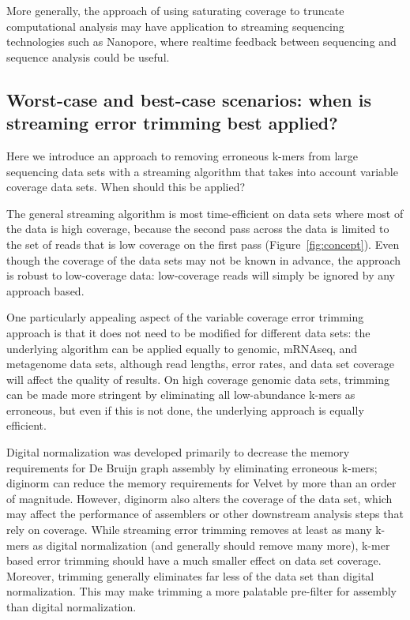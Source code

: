 \documentclass{article}
\begin{document}
More generally, the approach of using saturating coverage to truncate
computational analysis may have application to streaming sequencing
technologies such as Nanopore, where realtime feedback between
sequencing and sequence analysis could be useful.

\subsection{Worst-case and best-case scenarios: when is streaming error
trimming best applied?}

Here we introduce an approach to removing erroneous k-mers from large
sequencing data sets with a streaming algorithm that takes into
account variable coverage data sets.  When should this be applied?

The general streaming algorithm is most time-efficient on data sets
where most of the data is high coverage, because the second pass
across the data is limited to the set of reads that is low coverage on
the first pass (Figure~\ref{fig:concept}).  Even though the coverage
of the data sets may not be known in advance, the approach is robust
to low-coverage data: low-coverage reads will simply be ignored by any
approach based.

One particularly appealing aspect of the variable coverage error
trimming approach is that it does not need to be modified for
different data sets: the underlying algorithm can be applied equally
to genomic, mRNAseq, and metagenome data sets, although read lengths,
error rates, and data set coverage will affect the quality of results.
On high coverage genomic data sets, trimming can be made more
stringent by eliminating all low-abundance k-mers as erroneous, but
even if this is not done, the underlying approach is equally
efficient.

Digital normalization was developed primarily to decrease the memory
requirements for De Bruijn graph assembly by eliminating erroneous
k-mers; diginorm can reduce the memory requirements for Velvet by more
than an order of magnitude.  However, diginorm also alters the
coverage of the data set, which may affect the performance of
assemblers or other downstream analysis steps that rely on coverage.
While streaming error trimming removes at least as many k-mers as
digital normalization (and generally should remove many more), k-mer
based error trimming should have a much smaller effect on data set
coverage.  Moreover, trimming generally eliminates far less of the
data set than digital normalization.  This may make trimming a more
palatable pre-filter for assembly than digital normalization.
\end{document}

